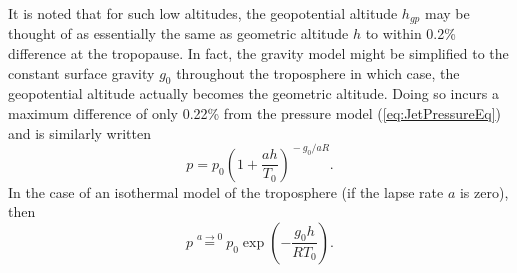 \documentclass[11pt,dvipsnames]{thesis}
\begin{document}
It is noted that for such low altitudes, the geopotential altitude $h_{gp}$ may be thought of as essentially the same as geometric altitude $h$ to within 0.2\% difference at the tropopause.
In fact, the gravity model might be simplified to the constant surface gravity $g_0$ throughout the troposphere in which case, the geopotential altitude actually becomes the geometric altitude. Doing so incurs a maximum difference of only 0.22\% from the pressure model (\ref{eq:JetPressureEq}) and is similarly written
\begin{equation}
p = p_0 \left(1 + \frac{a h}{T_0}\right)^{\!-g_0 / a R}.
\end{equation}
In the case of an isothermal model of the troposphere (if the lapse rate $a$ is zero), then
\begin{equation}
p \overset{a \to 0}{=} p_0 \exp\!\left(-\frac{g_0 h}{R T_0}\right).
\end{equation}
\end{document}

